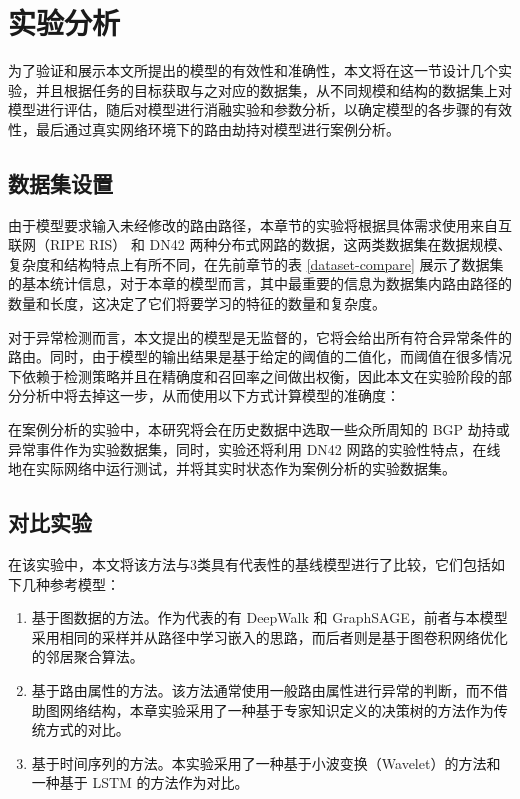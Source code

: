 \section{实验分析}


为了验证和展示本文所提出的模型的有效性和准确性，本文将在这一节设计几个实验，并且根据任务的目标获取与之对应的数据集，从不同规模和结构的数据集上对模型进行评估，随后对模型进行消融实验和参数分析，以确定模型的各步骤的有效性，最后通过真实网络环境下的路由劫持对模型进行案例分析。

\subsection{数据集设置}

由于模型要求输入未经修改的路由路径，本章节的实验将根据具体需求使用来自互联网（RIPE RIS） 和 DN42 两种分布式网路的数据，这两类数据集在数据规模、复杂度和结构特点上有所不同，在先前章节的表 \ref{dataset-compare} 展示了数据集的基本统计信息，对于本章的模型而言，其中最重要的信息为数据集内路由路径的数量和长度，这决定了它们将要学习的特征的数量和复杂度。

对于异常检测而言，本文提出的模型是无监督的，它将会给出所有符合异常条件的路由。同时，由于模型的输出结果是基于给定的阈值的二值化，而阈值在很多情况下依赖于检测策略并且在精确度和召回率之间做出权衡，因此本文在实验阶段的部分分析中将去掉这一步，从而使用以下方式计算模型的准确度：

在案例分析的实验中，本研究将会在历史数据中选取一些众所周知的 BGP 劫持或异常事件作为实验数据集，同时，实验还将利用 DN42 网路的实验性特点，在线地在实际网络中运行测试，并将其实时状态作为案例分析的实验数据集。

\subsection{对比实验}

在该实验中，本文将该方法与3类具有代表性的基线模型进行了比较，它们包括如下几种参考模型：

\begin{enumerate}
    \item 基于图数据的方法。作为代表的有 DeepWalk 和 GraphSAGE，前者与本模型采用相同的采样并从路径中学习嵌入的思路，而后者则是基于图卷积网络优化的邻居聚合算法。
    \item 基于路由属性的方法。该方法通常使用一般路由属性进行异常的判断，而不借助图网络结构，本章实验采用了一种基于专家知识定义的决策树的方法作为传统方式的对比。
    \item 基于时间序列的方法。本实验采用了一种基于小波变换（Wavelet）的方法和一种基于 LSTM 的方法作为对比。
\end{enumerate}

